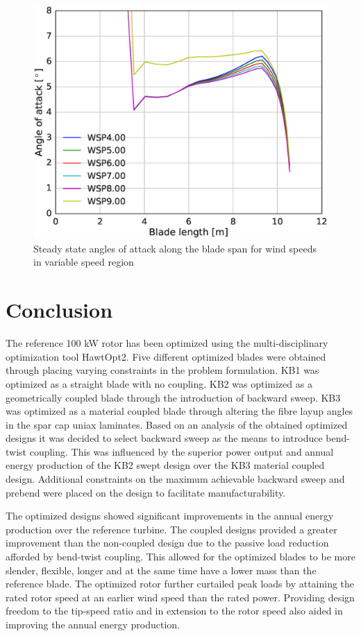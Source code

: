 
\begin{figure}[tph]
\centering
\includegraphics[width=0.8\linewidth]{figures/KB6_final/KB6_AoA_WSP_HS2.eps}
\caption{Steady state angles of attack along the blade span for wind speeds in variable speed region}
\label{fig:KB6_aoa}
\end{figure}

\section{Conclusion}
\label{sec:optimize_conc}
The reference 100 kW rotor has been optimized using the multi-disciplinary optimization tool HawtOpt2. Five different optimized blades were obtained through placing varying constraints in the problem formulation. KB1 was optimized as a straight blade with no coupling. KB2 was optimized as a geometrically coupled blade through the introduction of backward sweep. KB3 was optimized as a material coupled blade through altering the fibre layup angles in the spar cap uniax laminates. Based on an analysis of the obtained optimized designs it was decided to select backward sweep as the means to introduce bend-twist coupling. This was influenced by the superior power output and annual energy production of the KB2 swept design over the KB3 material coupled design. Additional constraints on the maximum achievable backward sweep and prebend were placed on the design to facilitate manufacturability.  

The optimized designs showed significant improvements in the annual energy production over the reference turbine. The coupled designs provided a greater improvement than the non-coupled design due to the passive load reduction afforded by bend-twist coupling. This allowed for the optimized blades to be more slender, flexible, longer and at the same time have a lower mass than the reference blade. The optimized rotor further curtailed peak loads by attaining the rated rotor speed at an earlier wind speed than the rated power. Providing design freedom to the tip-speed ratio and in extension to the rotor speed also aided in improving the annual energy production.
